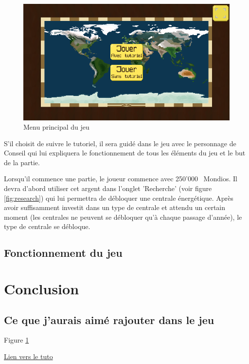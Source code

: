 \documentclass{article}
\newcommand{\initMoney}{250'000}
\begin{document}
        \begin{figure}[H]
                \includegraphics[width=\linewidth]{../images/mainMenu}
                \caption{Menu principal du jeu}
                \label{fig:mainMenu}
        \end{figure}
        
        
        S'il choisit de suivre le tutoriel, il sera guidé dans le jeu avec le personnage de Conseil qui lui expliquera le fonctionnement de tous les éléments du jeu et le but de la partie.
        
        
        Lorsqu'il commence une partie, le joueur commence avec \initMoney ~ Mondios. Il devra d'abord utiliser cet argent dans l'onglet 'Recherche' (voir figure \ref{fig:research}) qui lui permettra de débloquer une centrale énergétique. Après avoir suffisamment investit dans un type de centrale et attendu un certain moment (les centrales ne peuvent se débloquer qu'à chaque passage d'année), le type de centrale se débloque.
        \

        \subsection{Fonctionnement du jeu}
        
        \section{Conclusion}
        \subsection{Ce que j'aurais aimé rajouter dans le jeu}

        

        Figure \ref{fig:mainMenu}

        \href{https://www.latex-tutorial.com/tutorials/pgfplots/}{Lien vers le tuto}
\end{document}

